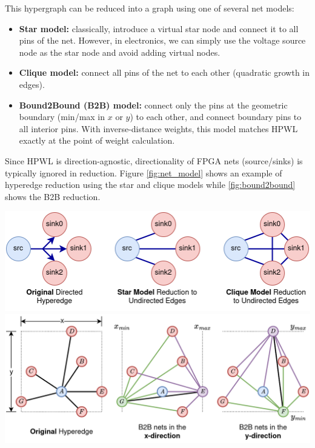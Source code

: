 This hypergraph can be reduced into a graph using one of several net models:
\begin{itemize}
    \item \textbf{Star model:} classically, introduce a virtual star node and connect it to all pins of the net. However, in electronics, we can simply use the voltage source node as the star node and avoid adding virtual nodes.
    \item \textbf{Clique model:} connect all pins of the net to each other (quadratic growth in edges). 
    \item \textbf{Bound2Bound (B2B) model:} connect only the pins at the geometric boundary (min/max in $x$ or $y$) to each other, and connect boundary pins to all interior pins. With inverse-distance weights, this model matches HPWL exactly at the point of weight calculation.
\end{itemize}


Since HPWL is direction-agnostic, directionality of FPGA nets (source/sinks) is typically ignored in reduction. 
Figure \ref{fig:net_model} shows an example of hyperedge reduction using the star and clique models while \ref{fig:bound2bound} shows the B2B reduction.

\vspace{1.0cm}
{
    \centering
    \includegraphics[width=\columnwidth]{figures/future_work/net_model.png}
    \label{fig:net_model}
}
{
    \centering
    \includegraphics[width=\columnwidth]{figures/future_work/bound2bound.png}
    \label{fig:bound2bound}
}

